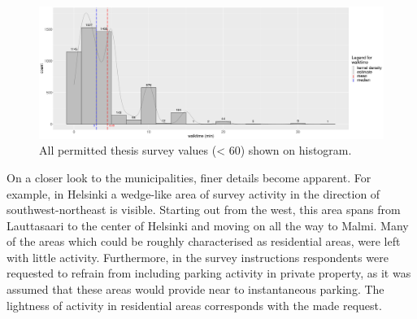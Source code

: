 \begin{figure}[H]%
    \centering
    \includegraphics[width=\textwidth]{images/hist_pmax59-wmax59_walktime-likert_binw2_02-08-2020.png}
    \caption[Histogram, walk to destination]{All permitted thesis survey  values (< 60) shown on histogram.}%
    \label{fig:walktime_hist}%
\end{figure}

On a closer look to the municipalities, finer details become apparent. For example, in Helsinki a wedge-like area of survey activity in the direction of southwest-northeast is visible. Starting out from the west, this area spans from Lauttasaari to the center of Helsinki and moving on all the way to Malmi. Many of the areas which could be roughly characterised as residential areas, were left with little activity. Furthermore, in the survey instructions respondents were requested to refrain from including parking activity in private property, as it was assumed that these areas would provide near to instantaneous parking. The lightness of activity in residential areas corresponds with the made request.

